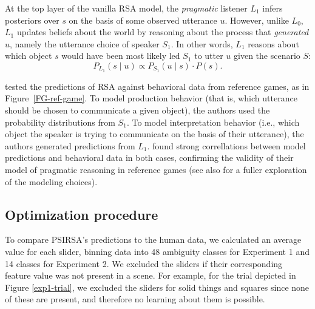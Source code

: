 \documentclass[10pt,a4paper]{article}
\newcommand{\gcs}[1]{\textcolor{blue}{[gcs: #1]}}
\begin{document}
At the top layer of the vanilla RSA model, the \emph{pragmatic} listener $L_1$ infers posteriors over $s$ on the basis of some observed utterance $u$.
However, unlike $L_0$, $L_1$ updates beliefs about the world by reasoning about the process that \emph{generated} $u$, namely the utterance choice of speaker $S_1$.
In other words, $L_1$ reasons about which object $s$ would have been most likely led $S_1$ to utter $u$ given the scenario $S$:
\begin{equation}
P_{L_{1}}(s \mid u) \propto P_{S_{1}}(u \mid s) \cdot P(s).
\end{equation}


 tested the predictions of RSA against behavioral data from reference games, as in Figure~\ref{FG-ref-game}.
To model production behavior (that is, which utterance should be chosen to communicate a given object), the authors used the probability distributions from $S_1$.
To model interpretation behavior (i.e., which object the speaker is trying to communicate on the basis of their utterance), the authors generated predictions from $L_1$.
\citeauthor{frankgoodman2012} found strong correllations between model predictions and behavioral data in both cases, confirming the validity of their model of pragmatic reasoning in reference games (see also  for a fuller exploration of the modeling choices).



\subsection*{Optimization procedure}


To compare PSIRSA's predictions to the human data, we calculated an average value for each slider, binning data into 48 ambiguity classes for Experiment 1 and 14 classes for Experiment 2. We excluded the sliders if their corresponding feature value was not present in a scene. For example, for the trial depicted in Figure \ref{exp1-trial}, we excluded the sliders for solid things and squares since none of these are present, and therefore no learning about them is possible.
\end{document}
